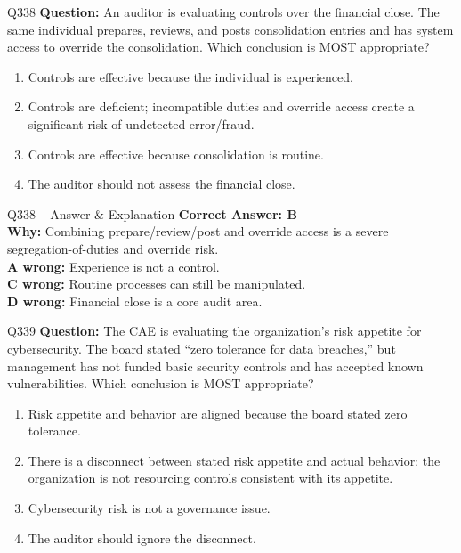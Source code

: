 \documentclass[aspectratio=169,10pt]{beamer}
\begin{document}
	\begin{frame}[t]{Q338}
		\small
		\textbf{Question:} An auditor is evaluating controls over the financial close. The same individual prepares, reviews, and posts consolidation entries and has system access to override the consolidation. Which conclusion is MOST appropriate?
		\begin{enumerate}[label=\Alph*.,itemsep=1pt,topsep=2pt]
			\item Controls are effective because the individual is experienced.
			\item Controls are deficient; incompatible duties and override access create a significant risk of undetected error/fraud.
			\item Controls are effective because consolidation is routine.
			\item The auditor should not assess the financial close.
		\end{enumerate}
	\end{frame}
	
	\begin{frame}[t]{Q338 -- Answer \& Explanation}
		\small
		\textbf{Correct Answer: B} \\[4pt]
		\textbf{Why:} Combining prepare/review/post and override access is a severe segregation-of-duties and override risk. \\[4pt]
		\textbf{A wrong:} Experience is not a control. \\[2pt]
		\textbf{C wrong:} Routine processes can still be manipulated. \\[2pt]
		\textbf{D wrong:} Financial close is a core audit area.
	\end{frame}
	
	\begin{frame}[t]{Q339}
		\small
		\textbf{Question:} The CAE is evaluating the organization's risk appetite for cybersecurity. The board stated ``zero tolerance for data breaches,'' but management has not funded basic security controls and has accepted known vulnerabilities. Which conclusion is MOST appropriate?
		\begin{enumerate}[label=\Alph*.,itemsep=1pt,topsep=2pt]
			\item Risk appetite and behavior are aligned because the board stated zero tolerance.
			\item There is a disconnect between stated risk appetite and actual behavior; the organization is not resourcing controls consistent with its appetite.
			\item Cybersecurity risk is not a governance issue.
			\item The auditor should ignore the disconnect.
		\end{enumerate}
	\end{frame}
	
\end{document}
